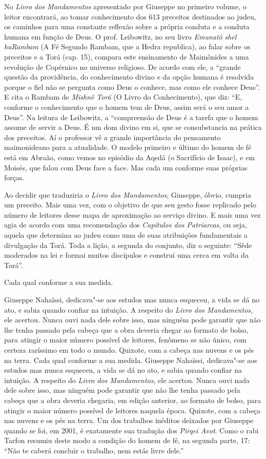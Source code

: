 No \emph{Livro dos Mandamentos} apresentado por Giuseppe no primeiro
volume, o leitor encontrará, ao tomar conhecimento dos 613 preceitos
destinados ao judeu, os caminhos para uma constante reflexão sobre a
própria conduta e a conduta humana em função de Deus. O prof. Leibowitz,
no seu livro \emph{Emunatô} \emph{shel haRambam} (A Fé Segundo Rambam,
que a Hedra republica), ao falar sobre os preceitos e a Torá (cap. 15),
compara este ensinamento de Maimônides a uma revolução de Copérnico no
universo religioso. De acordo com ele, a ``grande questão da
providência, do conhecimento divino e da opção humana é resolvida porque
o fiel não se pergunta como Deus o conhece, mas como ele conhece Deus''.
E cita o Rambam de \emph{Mishnê} \emph{Torá} (O Livro do Conhecimento),
que diz: ``E, conforme o conhecimento que o homem tem de Deus, assim
será o seu amor a Deus''. Na leitura de Leibowitz, a ``compreensão de
Deus é a tarefa que o homem assume de servir a Deus. É um dom divino em
si, que se consubstancia na prática dos preceitos. Aí o professor vê a
grande importância do pensamento maimonideano para a atualidade. O
modelo primeiro e último do homem de fé está em Abraão, como vemos no
episódio da Aqedá (o Sacrifício de Isaac), e em Moisés, que falou com
Deus face a face. Mas cada um conforme suas próprias forças.

Ao decidir que traduziria o \emph{Livro dos Mandamentos}, Giuseppe,
óbvio, cumpria um preceito. Mais uma vez, com o objetivo de que seu
gesto fosse replicado pelo número de leitores desse mapa de aproximação
ao serviço divino. E mais uma vez agia de acordo com uma recomendação
dos \emph{Capítulos dos Patriarcas}, ou seja, aquela que determina ao
judeu como uma de suas atribuições fundamentais a divulgação da Torá.
Toda a lição, a segunda do conjunto, diz o seguinte: ``Sêde moderados na
lei e formai muitos discípulos e construí uma cerca em volta da Torá''.

Cada qual conforme a sua medida.

Giuseppe Nahaïssi, dedicava"-se aos estudos mas nunca esqueceu, a vida se
dá no ato, e sabia quando confiar na intuição. A respeito do \emph{Livro
dos Mandamentos}, ele acertou. Nunca ouvi nada dele sobre isso, mas
ninguém pode garantir que não lhe tenha passado pela cabeça que a obra
deveria chegar ao formato de bolso, para atingir o maior número possível
de leitores, fenômeno se não único, com certeza raríssimo em todo o
mundo. Quixote, com a cabeça nas nuvens e os pés na terra. Cada qual
conforme a sua medida. Giuseppe Nahaïssi, dedicava"-se aos estudos mas
nunca esqueceu, a vida se dá no ato, e sabia quando confiar na intuição.
A respeito do \emph{Livro dos Mandamentos}, ele acertou. Nunca ouvi nada
dele sobre isso, mas ninguém pode garantir que não lhe tenha passado
pela cabeça que a obra deveria chegaria, em edição anterior, ao formato
de bolso, para atingir o maior número possível de leitores naquela
época. Quixote, com a cabeça nas nuvens e os pés na terra. Um dos
trabalhos inéditos deixados por Giuseppe quando se foi, em 2001, é
exatamente sua tradução dos \emph{Pirqei Avot}. Como o rabi Tarfon
resumiu deste modo a condição do homem de fé, na segunda parte, 17:
``Não te caberá concluir o trabalho, nem estás livre dele.''

